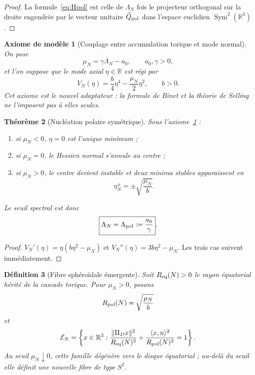 \documentclass[11pt,a4paper]{article}
\newtheorem{theorem}{Théorème}[section]
\newtheorem{definition}[theorem]{Définition}
\newtheorem{axiom}[theorem]{Axiome de modèle}
\newcommand{\R}{\mathbb R}
\begin{document}
\begin{proof}
La formule~\eqref{eq:Hpol} est celle de $\Lambda_N$ fois le projecteur orthogonal sur la droite engendrée par le vecteur unitaire $\widehat Q_{\rm pol}$ dans l'espace euclidien $\operatorname{Sym}^2(\R^3)$.
\end{proof}

\begin{axiom}[Couplage entre accumulation torique et mode normal]\label{ax:polar-coupling}
On pose
\begin{equation}\label{eq:muN}
 \mu_N=\gamma\Lambda_N-a_0,
 \qquad a_0,\gamma>0,
\end{equation}
et l'on suppose que le mode axial $\eta\in\R$ est régi par
\begin{equation}\label{eq:Vpolar}
 V_N(\eta)=\frac b4\eta^4-\frac{\mu_N}{2}\eta^2,
 \qquad b>0.
\end{equation}
Cet axiome est le nouvel adaptateur : la formule de Binet et la théorie de Selling ne l'imposent pas à elles seules.
\end{axiom}

\begin{theorem}[Nucléation polaire symétrique]\label{thm:polar-nucleation}
Sous l'axiome~\ref{ax:polar-coupling} :
\begin{enumerate}[label=\textup{(\roman*)}]
\item si $\mu_N<0$, $\eta=0$ est l'unique minimum ;
\item si $\mu_N=0$, le Hessien normal s'annule au centre ;
\item si $\mu_N>0$, le centre devient instable et deux minima stables apparaissent en
\begin{equation}\label{eq:poles}
 \eta_N^\pm=\pm\sqrt{\frac{\mu_N}{b}}.
\end{equation}
\end{enumerate}
Le seuil spectral est donc
\begin{equation}\label{eq:LambdaCrit}
 \boxed{\Lambda_N=\Lambda_{\rm pol}:=\frac{a_0}{\gamma}}.
\end{equation}
\end{theorem}

\begin{proof}
$V_N'(\eta)=\eta(b\eta^2-\mu_N)$ et $V_N''(\eta)=3b\eta^2-\mu_N$. Les trois cas suivent immédiatement.
\end{proof}

\begin{definition}[Fibre sphéroïdale émergente]
Soit $R_{\rm eq}(N)>0$ le rayon équatorial hérité de la cascade torique. Pour $\mu_N>0$, posons
\[
 R_{\rm pol}(N)=\sqrt{\frac{\mu_N}{b}}
\]
et
\begin{equation}\label{eq:spheroid}
 \mathcal E_N=
 \left\{x\in\R^3:
 \frac{\|\Pi_Dx\|^2}{R_{\rm eq}(N)^2}
 +\frac{\langle x,n\rangle^2}{R_{\rm pol}(N)^2}=1
 \right\}.
\end{equation}
Au seuil $\mu_N\downarrow0$, cette famille dégénère vers le disque équatorial ; au-delà du seuil elle définit une nouvelle fibre de type $S^2$.
\end{definition}
\end{document}
